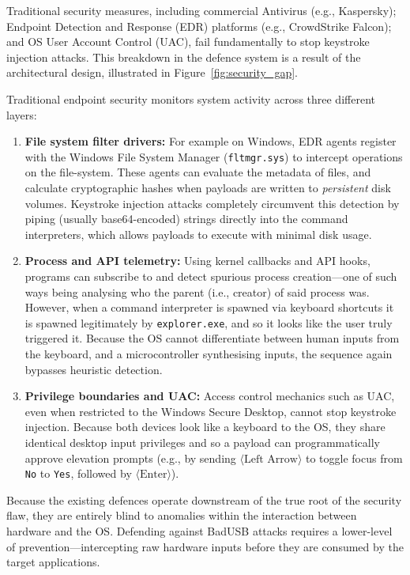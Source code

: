 Traditional security measures, including commercial Antivirus (e.g., Kaspersky); Endpoint Detection and Response (EDR) platforms (e.g., CrowdStrike Falcon); and OS User Account Control (UAC), fail fundamentally to stop keystroke injection attacks. This breakdown in the defence system is a result of the architectural design, illustrated in Figure~\ref{fig:security_gap}.

Traditional endpoint security monitors system activity across three different layers:
\begin{enumerate}
	\item \textbf{File system filter drivers:} For example on Windows, EDR agents register with the Windows File System Manager (\texttt{fltmgr.sys}) to intercept operations on the file-system. These agents can evaluate the metadata of files, and calculate cryptographic hashes when payloads are written to \textit{persistent} disk volumes. Keystroke injection attacks completely circumvent this detection by piping (usually base64-encoded) strings directly into the command interpreters, which allows payloads to execute with minimal disk usage.
	\item \textbf{Process and API telemetry:} Using kernel callbacks and API hooks, programs can subscribe to and detect spurious process creation---one of such ways being analysing who the parent (i.e., creator) of said process was. However, when a command interpreter is spawned via keyboard shortcuts it is spawned legitimately by \texttt{explorer.exe}, and so it looks like the user truly triggered it. Because the OS cannot differentiate between human inputs from the keyboard, and a microcontroller synthesising inputs, the sequence again bypasses heuristic detection.
	\item \textbf{Privilege boundaries and UAC:} Access control mechanics such as UAC, even when restricted to the Windows Secure Desktop, cannot stop keystroke injection. Because both devices look like a keyboard to the OS, they share identical desktop input privileges and so a payload can programmatically approve elevation prompts (e.g., by sending $\langle\text{Left Arrow}\rangle$ to toggle focus from \texttt{No} to \texttt{Yes}, followed by $\langle\text{Enter}\rangle$).
\end{enumerate}

Because the existing defences operate downstream of the true root of the security flaw, they are entirely blind to anomalies within the interaction between hardware and the OS. Defending against BadUSB attacks requires a lower-level of prevention---intercepting raw hardware inputs before they are consumed by the target applications.

